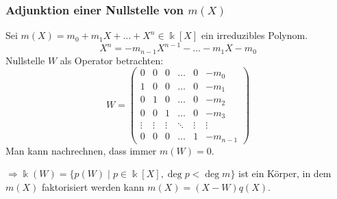 %
%
%
\begin{frame}[t]
\frametitle{Adjunktion einer Nullstelle von $m(X)$}
\setlength{\abovedisplayskip}{5pt}
\setlength{\belowdisplayskip}{5pt}
Sei $m(X)=m_0+m_1X+\dots + X^n\in \Bbbk[X]$ ein irreduzibles Polynom.
\[
X^n = -m_{n-1}X^{n-1} - \dots - m_1X - m_0
\]
Nullstelle $W$ als Operator betrachten:
\[
W = \begin{pmatrix}
     0&     0&     0&\dots &     0&   -m_0\\
     1&     0&     0&\dots &     0&   -m_1\\
     0&     1&     0&\dots &     0&   -m_2\\
     0&     0&     1&\dots &     0&   -m_3\\
\vdots&\vdots&\vdots&\ddots&\vdots& \vdots\\
     0&     0&     0&\dots &     1&-m_{n-1}
\end{pmatrix}
\]
Man kann nachrechnen, dass immer $m(W)=0$.
\medskip

$\Rightarrow \Bbbk(W) = \{p(W)\;|\;p\in\Bbbk[X], \deg p<\deg m\}$
ist ein Körper, in dem $m(X)$ faktorisiert werden kann $m(X) = (X-W)q(X)$.
\end{frame}
